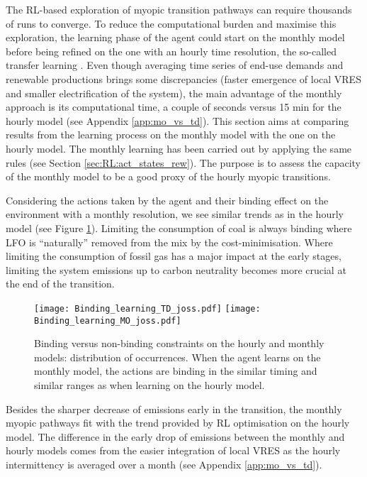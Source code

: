 The \gls{RL}-based exploration of myopic transition pathways can require thousands of runs to converge. To reduce the computational burden and maximise this exploration, the learning phase of the agent could start on the monthly model before being refined on the one with an hourly time resolution, the so-called transfer learning \cite{mann2013directed}.  Even though averaging time series of end-use demands and renewable productions brings some discrepancies (\ie faster emergence of local VRES and smaller electrification of the system), the main advantage of the monthly approach is its computational time, \ie a couple of seconds versus 15 min for the hourly model (see Appendix \ref{app:mo_vs_td}). This section aims at comparing results from the learning process on the monthly model with the one on the hourly model. The monthly learning has been carried out by applying the same rules (see Section \ref{sec:RL:act_states_rew}). The purpose is to assess the capacity of the monthly model to be a good proxy of the hourly myopic transitions.

Considering the actions taken by the agent and their binding effect on the environment with a monthly resolution,  we see similar trends as in the hourly model (see Figure \ref{fig:app:Binding_constr_joss}). Limiting the consumption of coal is always binding where \gls{LFO} is ``naturally'' removed from the mix by the cost-minimisation. Where limiting the consumption of fossil gas has a major impact at the early stages, limiting the system emissions up to carbon neutrality becomes more crucial at the end of the transition.

\begin{figure}[!htbp]
\centering
\texttt{[image: Binding\_learning\_TD\_joss.pdf]}
\texttt{[image: Binding\_learning\_MO\_joss.pdf]}
\caption{Binding versus non-binding constraints on the hourly and monthly models: distribution of occurrences. When the agent learns on the monthly model, the actions are binding in the similar timing and similar ranges as when learning on the hourly model. }
\label{fig:app:Binding_constr_joss}
\end{figure} 

Besides the sharper decrease of emissions early in the transition, the monthly myopic pathways fit with the trend provided by \gls{RL} optimisation on the hourly model. The difference in the early drop of emissions between the monthly and hourly models comes from the easier integration of local \gls{VRES} as the hourly intermittency is averaged over a month (see Appendix \ref{app:mo_vs_td}). 

